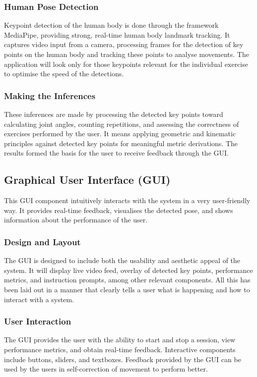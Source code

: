         \subsubsection{Human Pose Detection}
            Keypoint detection of the human body is done through the framework MediaPipe, providing strong, real-time human body landmark tracking. It captures video input from a camera, processing frames for the detection of key points on the human body and tracking these points to analyse movements. The application will look only for those keypoints relevant for the individual exercise to optimise the speed of the detections.
        \subsubsection{Making the Inferences}
            These inferences are made by processing the detected key points toward calculating joint angles, counting repetitions, and assessing the correctness of exercises performed by the user. It means applying geometric and kinematic principles against detected key points for meaningful metric derivations. The results formed the basis for the user to receive feedback through the GUI.
    \subsection{Graphical User Interface (GUI)}
        This GUI component intuitively interacts with the system in a very user-friendly way. It provides real-time feedback, visualises the detected pose, and shows information about the performance of the user.
        \subsubsection{Design and Layout}
            The GUI is designed to include both the usability and aesthetic appeal of the system. It will display live video feed, overlay of detected key points, performance metrics, and instruction prompts, among other relevant components. All this has been laid out in a manner that clearly tells a user what is happening and how to interact with a system.
        \subsubsection{User Interaction}
            The GUI provides the user with the ability to start and stop a session, view performance metrics, and obtain real-time feedback. Interactive components include buttons, sliders, and textboxes. Feedback provided by the GUI can be used by the users in self-correction of movement to perform better.
